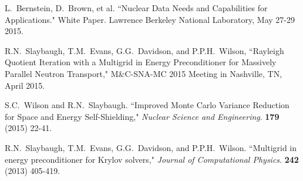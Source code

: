 \begin{bibsection}
\item L.\ Bernstein, D.\ Brown, et al. ``Nuclear Data Needs and Capabilities for Applications." White Paper. Lawrence Berkeley National Laboratory, May 27-29 2015. 

\item  R.N.\ Slaybaugh, T.M.\ Evans, G.G.\ Davidson, and P.P.H.\ Wilson, ``Rayleigh Quotient Iteration with a Multigrid in Energy Preconditioner for Massively Parallel Neutron Transport," M\&C-SNA-MC 2015 Meeting in Nashville, TN, April 2015.


\item S.C.\ Wilson and R.N.\ Slaybaugh. ``Improved Monte Carlo Variance Reduction for Space and Energy Self-Shielding," \textit{Nuclear Science and Engineering}. \textbf{179} (2015) 22-41.




\item R.N.\ Slaybaugh, T.M.\ Evans, G.G.\ Davidson, and P.P.H.\ Wilson. ``Multigrid in energy preconditioner for Krylov solvers," \textit{Journal of Computational Physics}. \textbf{242} (2013) 405-419.



\end{bibsection}
